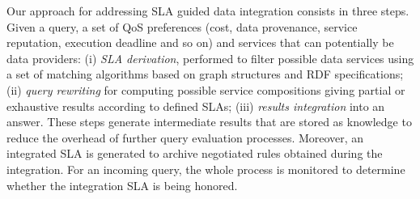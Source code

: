 

Our approach for addressing SLA guided data  integration consists in three steps. Given a query, a set of QoS preferences (cost, data provenance, service reputation, execution deadline and so on) and  services that can potentially be data providers:  (i)  {\em SLA derivation}, performed to filter possible data services  using a set of matching algorithms based on  graph structures and RDF specifications;
(ii)  {\em query rewriting} for computing possible service compositions giving partial or exhaustive  results according to defined SLAs; (iii)  {\em results  integration} into an answer. 
These steps generate intermediate results that are stored as knowledge  to reduce the overhead of further query evaluation processes. Moreover, an integrated SLA is generated to archive  negotiated rules obtained during  the integration. For an incoming query, the whole process is monitored to determine whether the integration SLA is being honored.



